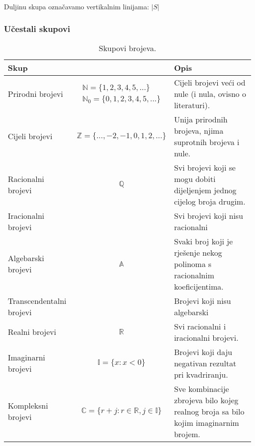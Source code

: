 Duljinu skupa označavamo vertikalnim linijama: $|S|$

\subsubsection{Učestali skupovi}

\begin{table}[ht]
    \center
    \begin{tabular}{l c p{5cm}}
    \hline
    Skup & & Opis \\ \hline \hline

    Prirodni brojevi\index{Prirodni brojevi} &
    $
    \begin{array}{c}
        \mathbb{N} = \{1, 2, 3, 4, 5, \dots\} \\
        \mathbb{N}_0 = \{0, 1, 2, 3, 4, 5, \dots\}
    \end{array}
    $ &
    Cijeli brojevi veći od nule (i nula, ovisno o literaturi). \\ \hline

    Cijeli brojevi &
    $
    \mathbb{Z} = \{..., -2, -1, 0, 1, 2, ...\}
    $ &
    Unija prirodnih brojeva, njima suprotnih brojeva i nule. \\ \hline

    Racionalni brojevi &
    $\mathbb{Q}$ &
    Svi brojevi koji se mogu dobiti dijeljenjem jednog cijelog broja drugim. \\ \hline

    Iracionalni brojevi & &
    Svi brojevi koji nisu racionalni \\ \hline

    Algebarski brojevi &
    $\mathbb{A}$ &
    Svaki broj koji je rješenje nekog polinoma s racionalnim koeficijentima. \\ \hline

    Transcendentalni brojevi & &
    Brojevi koji nisu algebarski \\ \hline

    Realni brojevi &
    $\mathbb{R}$ &
    Svi racionalni i iracionalni brojevi. \\ \hline

    Imaginarni brojevi &
    $
    \mathbb{I} = \{x: x < 0\}
    $ &
    Brojevi koji daju negativan rezultat pri kvadriranju. \\ \hline

    Kompleksni brojevi &
    $
    \mathbb{C} = \{r + j: r \in \mathbb{R}, j \in \mathbb{I}\}
    $ &
    Sve kombinacije zbrojeva bilo kojeg realnog broja sa bilo kojim imaginarnim brojem. \\ \hline
    \end{tabular}
    \caption{\label{tab:table-name} Skupovi brojeva.}
\end{table}
\newpage

